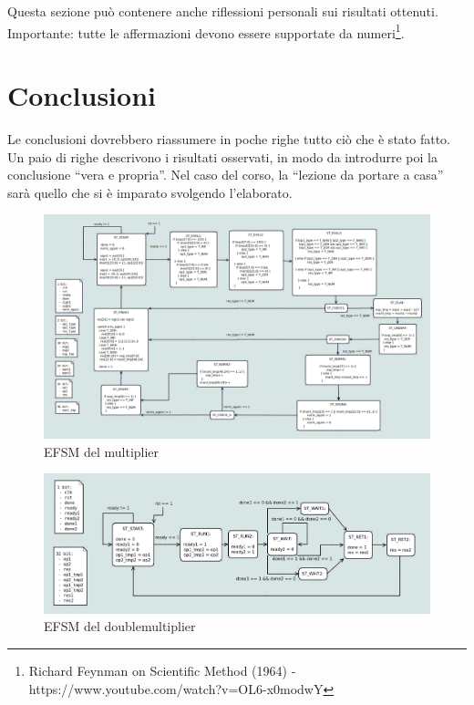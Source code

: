 \documentclass[]{IEEEtran}
\begin{document}
Questa sezione può contenere anche riflessioni personali sui risultati ottenuti. Importante: tutte le affermazioni devono essere supportate da numeri\footnote{Richard Feynman on Scientific Method (1964) -\\ https://www.youtube.com/watch?v=OL6-x0modwY}.

\section{Conclusioni}
Le conclusioni dovrebbero riassumere in poche righe  tutto ciò che è stato fatto. Un paio di righe descrivono i risultati osservati, in modo da introdurre poi la conclusione ``vera e propria''. Nel caso del corso, la ``lezione da portare a casa'' sarà quello che si è imparato svolgendo l'elaborato.




\appendix

\begin{figure}[bt]
\centering
\includegraphics[width=\textwidth]{figures/EFSM-multiplier}
\caption{EFSM del multiplier}
\label{fig:EFSM1}
\end{figure}

\begin{figure}[bt]
\centering
\includegraphics[width=\textwidth]{figures/EFSM-top_level}
\caption{EFSM del double\textunderscore multiplier}
\label{fig:EFSM2}
\end{figure}
\end{document}
